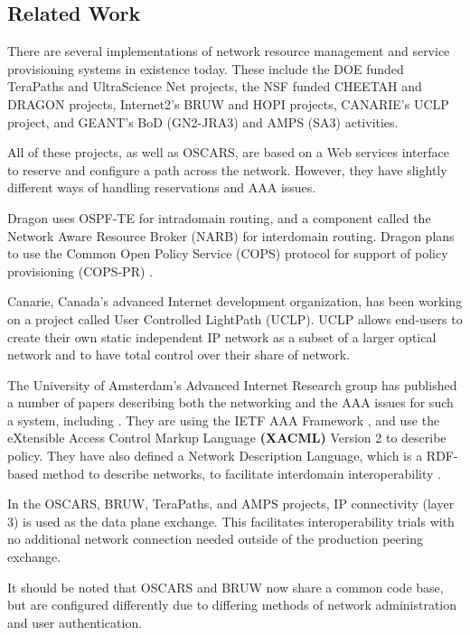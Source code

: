 \documentclass[conference]{IEEEtran}
\begin{document}
\subsection{Related Work}

There are several implementations of network resource management and
service provisioning systems in existence today.  These include the DOE funded
TeraPaths \cite{TeraPaths} and UltraScience Net \cite{USN} projects, the NSF funded CHEETAH \cite{CHEETAH} and
DRAGON \cite{DRAGON} projects,
Internet2's BRUW \cite{BRUW} and HOPI \cite{HOPI} projects, CANARIE's UCLP \cite{UCLP} 
project, and GEANT's
BoD (GN2-JRA3) \cite{GEANT} and AMPS (SA3) \cite{GEANT-AMPS} activities.

All of these projects, as well as OSCARS, are based on a Web services 
interface to reserve and configure a path across the network. However, they 
have slightly different ways of handling reservations and AAA issues.

Dragon uses OSPF-TE \cite{ospf-te} for intradomain routing, and a component called
the Network Aware Resource Broker (NARB) for interdomain routing.
Dragon plans to use the Common Open Policy Service (COPS) \cite{COPS}
protocol for support of policy provisioning (COPS-PR) \cite{COPS-PR}.

Canarie, Canada's advanced Internet development organization, has been
working on a project called User Controlled LightPath (UCLP).  UCLP
allows end-users to create their own static independent IP network as a subset
of a larger optical network and to have total control over their share
of network.

The University of Amsterdam's Advanced Internet Research group has
published a number of papers
describing both the networking and the AAA issues for such a system,
including \cite{gommans05} \cite{gommans06} \cite{demchenko} . 
They are using the IETF AAA Framework
\cite{AAA}, and use the 
eXtensible Access Control Markup Language \textbf{(XACML)} Version 2
to describe policy. They have also defined a
Network Description Language, which is a RDF-based method to
describe networks, to facilitate interdomain interoperability \cite{ndl}.

In the OSCARS, BRUW, TeraPaths, and AMPS projects, IP connectivity (layer
3) is used as the data plane exchange.  This facilitates interoperability
trials with no additional network connection needed outside of the production
peering exchange.

It should be noted that OSCARS and BRUW now share a common code base, but
are configured differently due to differing methods of network administration
and user authentication.
\end{document}
